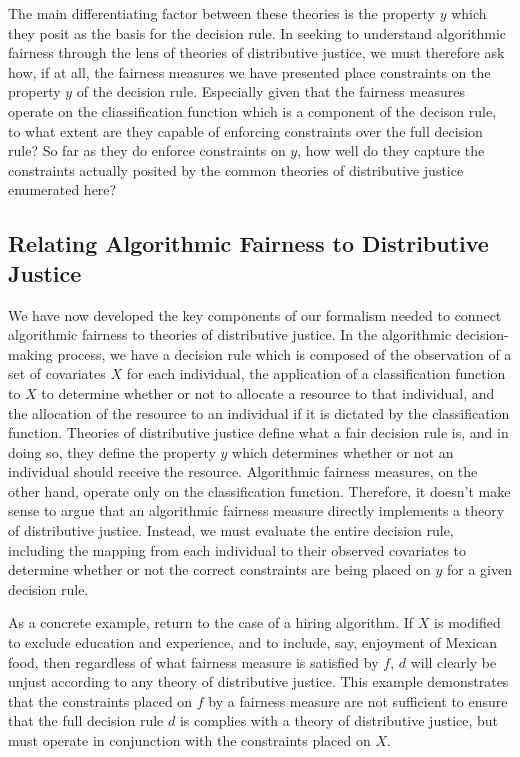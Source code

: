 The main differentiating factor between these theories is the property $y$ which
they posit as the basis for the decision rule. In seeking to understand
algorithmic fairness through the lens of theories of distributive justice, we 
must therefore ask how, if at all, the fairness measures we have presented place
constraints on the property $y$ of the decision rule. Especially given
that the fairness measures operate on the cliassification function which is a
component of the decison rule, to what extent are they capable of enforcing
constraints over the full decision rule? So far as they do enforce constraints
on $y$, how well do they capture the constraints actually posited by the common
theories of distributive justice enumerated here?

\subsection{Relating Algorithmic Fairness to Distributive Justice}

We have now developed the key components of our formalism needed to connect 
algorithmic fairness to theories of distributive justice. In the algorithmic
decision-making process, we have a decision rule which is composed of the
observation of a set of covariates $X$ for each individual, the application
of a classification function to $X$ to determine whether or not to allocate a
resource to that individual, and the allocation of the resource to an individual
if it is dictated by the classification function. Theories of distributive
justice define what a fair decision rule is, and in doing so, they define the
property $y$ which determines whether or not an individual should receive the
resource. Algorithmic fairness measures, on the other hand, operate only on the
classification function. Therefore, it doesn't make sense to argue that an
algorithmic fairness measure directly implements a theory of distributive
justice. Instead, we must evaluate the entire decision rule, including the
mapping from each individual to their observed covariates to determine whether
or not the correct constraints are being placed on $y$ for a given decision
rule.

As a concrete example, return to the case of a hiring algorithm. If $X$ is
modified to exclude education and experience, and to include, say, enjoyment of
Mexican food, then regardless of what fairness measure is satisfied by $f$, $d$
will clearly be unjust according to any theory of distributive justice. This
example demonstrates that the constraints placed on $f$ by a fairness measure
are not sufficient to ensure that the full decision rule $d$ is complies with a
theory of distributive justice, but must operate in conjunction with the
constraints placed on $X$.

